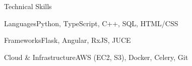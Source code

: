 \documentclass[
	11pt
]{../../../template}
\begin{document}
	\begin{rSection}{T}{echnical Skills}
		\begin{rSet}{Languages}{Python, TypeScript, C++, SQL, HTML/CSS}
		\end{rSet}
		\begin{rSet}{Frameworks}{Flask, Angular, RxJS, JUCE}
		\end{rSet}
		\begin{rSet}{Cloud \& Infrastructure}{AWS (EC2, S3), Docker, Celery, Git}
		\end{rSet}
	\end{rSection}
\end{document}
